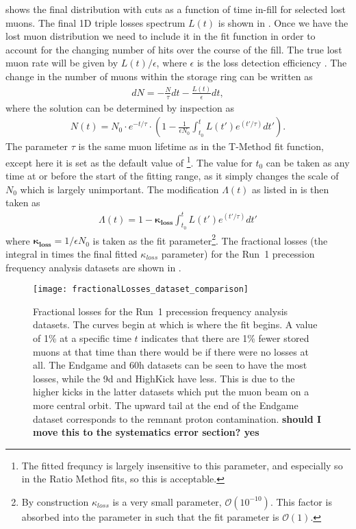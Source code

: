  shows the final \DT distribution with cuts as a function of time in-fill for selected lost muons. The final 1D triple losses spectrum $L(t)$ is shown in . Once we have the lost muon distribution we need to include it in the fit function in order to account for the changing number of hits over the course of the fill. The true lost muon rate will be given by $L(t)/\epsilon$, where $\epsilon$ is the loss detection efficiency \cite{AFThesis}. The change in the number of muons within the storage ring can be written as 
    \begin{align} 
        dN = -\frac{N}{\tau} dt - \frac{L(t)}{\epsilon} dt, 
    \end{align}
where the solution can be determined by inspection as
    \begin{align} 
        N(t) = N_{0} \cdot e^{-t/\tau} \cdot (1 - \frac{1}{\epsilon N_{0}} \int_{t_{0}}^{t} L(t')e^{(t'/\tau)} dt').
    \end{align}
The parameter $\tau$ is the same muon lifetime as in the T-Method fit function, except here it is set as the default value of \footnote{The fitted \wa frequncy is largely insensitive to this parameter, and especially so in the Ratio Method fits, so this is acceptable.}. The value for $t_{0}$ can be taken as any time at or before the start of the fitting range, as it simply changes the scale of $N_{0}$ which is largely unimportant. The modification $\Lambda(t)$ as listed in  is then taken as
    \begin{align} \label{eq:lambdalosses}
        \Lambda(t) = 1 - \boldsymbol{\kappa_{loss}} \int_{t_{0}}^{t} L(t')e^{(t'/\tau)} dt'
    \end{align}
where $\boldsymbol{\kappa_{loss}} = 1/\epsilon N_{0}$ is taken as the fit parameter\footnote{By construction $\kappa_{loss}$ is a very small parameter, $\mathcal{O}(10^{-10})$. This factor is absorbed into the parameter in such that the fit parameter is $\mathcal{O}(1)$.}. The fractional losses (the integral in  times the final fitted $\kappa_{loss}$ parameter) for the Run~1 precession frequency analysis datasets are shown in .



\begin{figure}[]
    \centering
    \texttt{[image: fractionalLosses\_dataset\_comparison]}
    \caption[Fractional muon losses in the analyzed Run~1 datasets]{Fractional losses for the Run~1 precession frequency analysis datasets. The curves begin at  which is where the fit begins. A value of 1\% at a specific time $t$ indicates that there are 1\% fewer stored muons at that time than there would be if there were no losses at all. The Endgame and 60h datasets can be seen to have the most losses, while the 9d and HighKick have less. This is due to the higher kicks in the latter datasets which put the muon beam on a more central orbit. The upward tail at the end of the Endgame dataset corresponds to the remnant proton contamination. \textbf{should I move this to the systematics error section? yes}}
    \label{fig:fractionallosses}
\end{figure}



